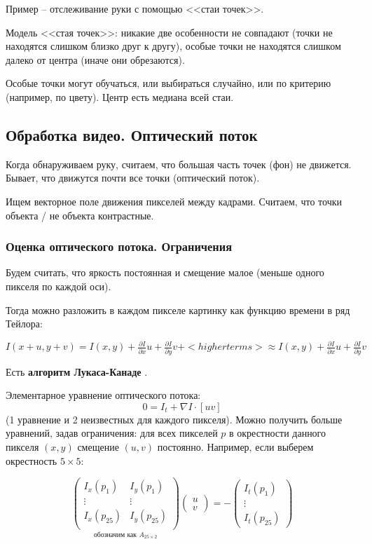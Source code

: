 \documentclass[main.tex]{subfiles}
\begin{document}
Пример -- отслеживание руки с помощью <<стаи точек>>.

Модель <<стая точек>>: никакие две особенности не совпадают (точки не находятся слишком близко друг к другу), особые точки не находятся слишком далеко от центра (иначе они обрезаются).

Особые точки могут обучаться, или выбираться случайно, или по критерию (например, по цвету).
Центр есть медиана всей стаи.

\subsection{Обработка видео. Оптический поток}

Когда обнаруживаем руку, считаем, что большая часть точек (фон) не движется.
Бывает, что движутся почти все точки (оптический поток).

Ищем векторное поле движения пикселей между кадрами.
Считаем, что точки объекта / не объекта контрастные.

\subsubsection{ Оценка оптического потока. Ограничения }

Будем считать, что яркость постоянная и смещение малое (меньше одного пикселя по каждой оси).

Тогда можно разложить в каждом пикселе картинку как функцию времени в ряд Тейлора:

$ I(x + u, y + v) = I(x,y) + \frac{\partial I}{\partial x} u + \frac{\partial I}{\partial y} v + <higher terms> \approx I(x,y) + \frac{\partial I}{\partial x} u + \frac{\partial I}{\partial y} v $

Есть \textbf{алгоритм Лукаса-Канаде }.

Элементарное уравнение оптического потока:
$$ 0 = I_t + \nabla I \cdot [u v] $$
(1 уравнение и 2 неизвестных для каждого пикселя).
Можно получить больше уравнений, задав ограничения:
для всех пикселей $ p $ в окрестности данного пикселя $ (x,y) $ смещение $ (u,v) $ постоянно.
Например, если выберем окрестность $ 5 \times 5 $:

$$ \underset{\text{обозначим как } A_{25 \times 2}}{
\begin{pmatrix}
    I_x(p_1) & I_y(p_1) \\
    \vdots & \vdots \\
    I_x(p_{25}) & I_y(p_{25}) \\
\end{pmatrix} }
\begin{pmatrix}
u \\ v
\end{pmatrix} = - \begin{pmatrix}
I_t(p_1) \\ \vdots \\ I_t(p_25)
\end{pmatrix} $$
\end{document}

